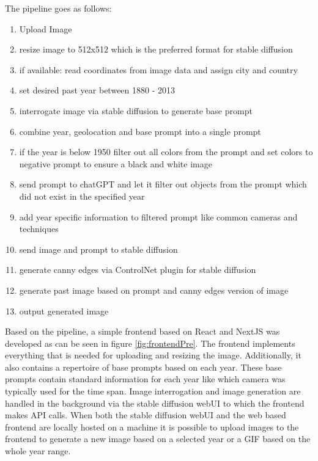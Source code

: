 \documentclass[english,notitlepage,smartquotes]{hgbreport}
\begin{document}
The pipeline goes as follows:
\begin{enumerate}
    \item Upload Image
    \item resize image to 512x512 which is the preferred format for stable diffusion
    \item if available: read coordinates from image data and assign city and country
    \item set desired past year between 1880 - 2013
    \item interrogate image via stable diffusion to generate base prompt
    \item combine year, geolocation and base prompt into a single prompt
    \item if the year is below 1950 filter out all colors from the prompt and set colors to negative prompt to ensure a black and white image
    \item send prompt to chatGPT and let it filter out objects from the prompt which did not exist in the specified year
    \item add year specific information to filtered prompt like common cameras and techniques
    \item send image and prompt to stable diffusion 
    \item generate canny edges via ControlNet plugin for stable diffusion
    \item generate past image based on prompt and canny edges version of image
    \item output generated image
\end{enumerate}

Based on the pipeline, a simple frontend based on React and NextJS was developed as can be seen in figure \ref{fig:frontendPre}. The frontend implements everything that is needed for uploading and resizing the image. Additionally, it also contains a repertoire of base prompts based on each year. These base prompts contain standard information for each year like which camera was typically used for the time span. Image interrogation and image generation are handled in the background via the stable diffusion webUI to which the frontend makes API calls.
When both the stable diffusion webUI and the web based frontend are locally hosted on a machine it is possible to upload images to the frontend to generate a new image based on a selected year or a GIF based on the whole year range.
\end{document}
